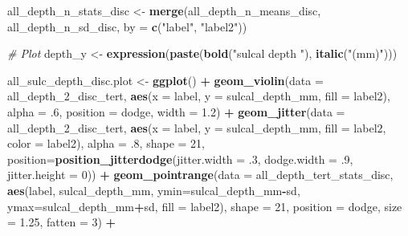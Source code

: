 \documentclass[
]{article}
\newenvironment{Shaded}{\begin{snugshade}}{\end{snugshade}}
\newcommand{\CommentTok}[1]{\textcolor[rgb]{0.56,0.35,0.01}{\textit{#1}}}
\newcommand{\DataTypeTok}[1]{\textcolor[rgb]{0.13,0.29,0.53}{#1}}
\newcommand{\DecValTok}[1]{\textcolor[rgb]{0.00,0.00,0.81}{#1}}
\newcommand{\FloatTok}[1]{\textcolor[rgb]{0.00,0.00,0.81}{#1}}
\newcommand{\KeywordTok}[1]{\textcolor[rgb]{0.13,0.29,0.53}{\textbf{#1}}}
\newcommand{\NormalTok}[1]{#1}
\newcommand{\OperatorTok}[1]{\textcolor[rgb]{0.81,0.36,0.00}{\textbf{#1}}}
\newcommand{\StringTok}[1]{\textcolor[rgb]{0.31,0.60,0.02}{#1}}
\begin{document}
\begin{Shaded}
\begin{Highlighting}[]
\NormalTok{all_depth_n_stats_disc <-}\StringTok{ }\KeywordTok{merge}\NormalTok{(all_depth_n_means_disc, all_depth_n_sd_disc, }\DataTypeTok{by =} \KeywordTok{c}\NormalTok{(}\StringTok{"label"}\NormalTok{, }\StringTok{"label2"}\NormalTok{))}


\CommentTok{# Plot}
\NormalTok{depth_y <-}\StringTok{ }\KeywordTok{expression}\NormalTok{(}\KeywordTok{paste}\NormalTok{(}\KeywordTok{bold}\NormalTok{(}\StringTok{"sulcal depth "}\NormalTok{), }\KeywordTok{italic}\NormalTok{(}\StringTok{"(mm)"}\NormalTok{)))}

\NormalTok{all_sulc_depth_disc.plot <-}\StringTok{ }\KeywordTok{ggplot}\NormalTok{() }\OperatorTok{+}
\StringTok{  }\KeywordTok{geom_violin}\NormalTok{(}\DataTypeTok{data =}\NormalTok{ all_depth_}\DecValTok{2}\NormalTok{_disc_tert, }\KeywordTok{aes}\NormalTok{(}\DataTypeTok{x =}\NormalTok{ label, }\DataTypeTok{y =}\NormalTok{ sulcal_depth_mm, }\DataTypeTok{fill =}\NormalTok{ label2), }
              \DataTypeTok{alpha =} \FloatTok{.6}\NormalTok{, }\DataTypeTok{position =}\NormalTok{ dodge, }\DataTypeTok{width =} \FloatTok{1.2}\NormalTok{) }\OperatorTok{+}\StringTok{ }
\StringTok{  }\KeywordTok{geom_jitter}\NormalTok{(}\DataTypeTok{data =}\NormalTok{ all_depth_}\DecValTok{2}\NormalTok{_disc_tert, }\KeywordTok{aes}\NormalTok{(}\DataTypeTok{x =}\NormalTok{ label, }\DataTypeTok{y =}\NormalTok{ sulcal_depth_mm, }\DataTypeTok{fill =}\NormalTok{ label2, }\DataTypeTok{color =}\NormalTok{ label2), }
              \DataTypeTok{alpha =} \FloatTok{.8}\NormalTok{, }\DataTypeTok{shape =} \DecValTok{21}\NormalTok{,}
              \DataTypeTok{position=}\KeywordTok{position_jitterdodge}\NormalTok{(}\DataTypeTok{jitter.width =} \FloatTok{.3}\NormalTok{, }\DataTypeTok{dodge.width =} \FloatTok{.9}\NormalTok{, }\DataTypeTok{jitter.height =} \DecValTok{0}\NormalTok{)) }\OperatorTok{+}
\StringTok{  }\KeywordTok{geom_pointrange}\NormalTok{(}\DataTypeTok{data =}\NormalTok{ all_depth_tert_stats_disc, }
                  \KeywordTok{aes}\NormalTok{(label, sulcal_depth_mm, }\DataTypeTok{ymin=}\NormalTok{sulcal_depth_mm}\OperatorTok{-}\NormalTok{sd, }\DataTypeTok{ymax=}\NormalTok{sulcal_depth_mm}\OperatorTok{+}\NormalTok{sd, }\DataTypeTok{fill =}\NormalTok{ label2), }
                  \DataTypeTok{shape =} \DecValTok{21}\NormalTok{, }\DataTypeTok{position =}\NormalTok{ dodge, }\DataTypeTok{size =} \FloatTok{1.25}\NormalTok{, }\DataTypeTok{fatten =} \DecValTok{3}\NormalTok{) }\OperatorTok{+}
\StringTok{  }

\end{Highlighting}
\end{Shaded}
\end{document}
